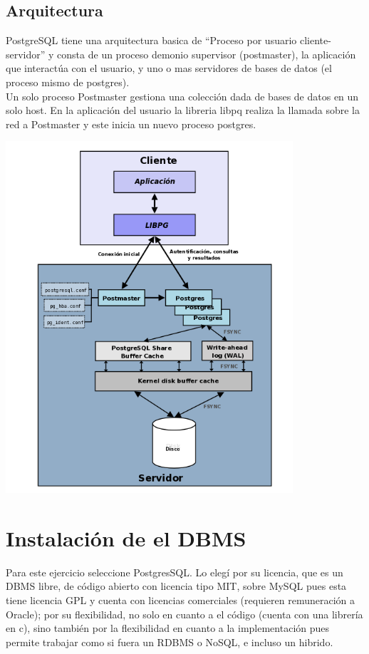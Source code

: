 \documentclass[spanish,12pt,letterpapper]{article}
\begin{document}
	   \subsection{Arquitectura}
	   PostgreSQL tiene una arquitectura basica de ``Proceso por usuario cliente-servidor'' y consta de un proceso demonio supervisor (postmaster), la aplicación que interactúa con el usuario, y uno o mas servidores de bases de datos (el proceso mismo de postgres).\\
	   
	   Un solo proceso Postmaster gestiona una colección dada de bases de datos en un solo host. En la aplicación del usuario la libreria libpq realiza la llamada sobre la red a Postmaster y este inicia un nuevo proceso postgres.\\
	   
	   \begin{center}
	   \includegraphics[width=0.8\textwidth]{./arqpq}~\\[1cm]
	   \end{center}
	   \pagebreak
	   

	
	\section{Instalación de el DBMS}
	Para este ejercicio seleccione PostgresSQL. Lo elegí por su licencia, que es un DBMS libre, de código abierto con licencia tipo MIT, sobre MySQL pues esta tiene licencia GPL y cuenta con licencias comerciales (requieren remuneración a Oracle); por su flexibilidad, no solo en cuanto a el código (cuenta con una librería en c), sino también por la flexibilidad en cuanto a la implementación pues permite trabajar como si fuera un RDBMS o NoSQL, e incluso un hibrido.\\
	
\end{document}
